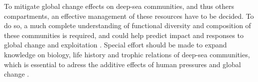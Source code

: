 To mitigate global change effects on deep-sea communities, and thus others compartments, an effective management of these resources have to be decided. To do so, a much complete understanding of functional diversity and composition of these communities is required, and could help predict impact and responses to global change and exploitation \citep{carrington2021,dumay2004,kremer2017}. Special effort should be made to expand knowledge on biology, life history and trophic relations of deep-sea communities, which is essential to adress the additive effects of human pressures and global change \citep{danovaro2017}.





